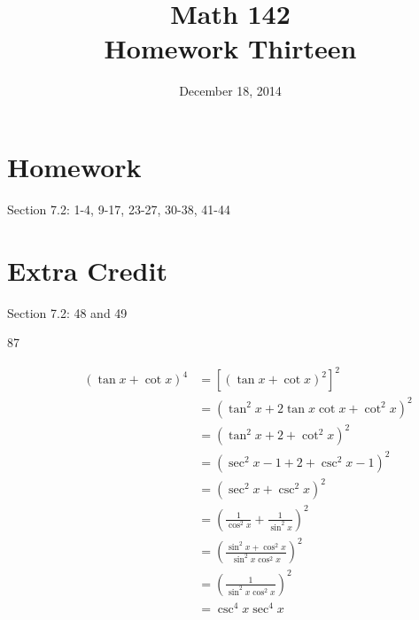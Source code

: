 \documentclass{exam}
\author{}
\date{December 18, 2014}
\title{Math 142 \\ Homework Thirteen}
\begin{document}
  \maketitle

  \section{Homework}
  Section 7.2: 1-4, 9-17, 23-27, 30-38, 41-44

  \section{Extra Credit}
  Section 7.2: 48 and 49

  \ifprintanswers
    \pagebreak
    \begin{description}

      \item[87] 
        \begin{align*}
          (\tan x + \cot x)^4 & = \left[ (\tan x + \cot x)^2 \right]^2 \\
                              & = \left( \tan^2 x + 2 \tan x \cot x + \cot^2 x \right)^2 \\
                              & = \left( \tan^2 x + 2 + \cot^2 x \right)^2 \\
                              & = \left( \sec^2 x - 1 + 2 + \csc^2 x - 1 \right)^2 \\
                              & = \left( \sec^2 x + \csc^2 x \right)^2 \\
                              & = \left( \frac{1}{\cos^2 x} + \frac{1}{\sin^2 x} \right)^2 \\
                              & = \left( \frac{\sin^2 x + \cos^2 x}{\sin^2 x \cos^2 x} \right)^2 \\
                              & = \left( \frac{1}{\sin^2 x \cos^2 x} \right)^2 \\
                              & = \csc^4 x \sec^4 x \\
        \end{align*}

    \end{description}
  \fi

  \ifprintanswers
\end{document}
